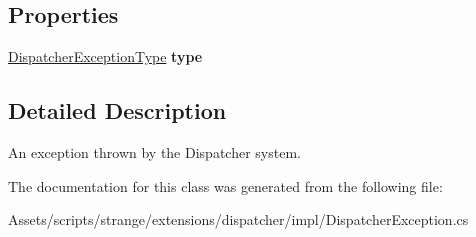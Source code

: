\subsection*{Properties}
\begin{DoxyCompactItemize}
\item 
\hypertarget{classstrange_1_1extensions_1_1dispatcher_1_1impl_1_1_dispatcher_exception_aaf683623803cc7c0b0cc725ed6349a3b}{\hyperlink{namespacestrange_1_1extensions_1_1dispatcher_1_1api_a03ba459ad62cc042c88405d9419eb4c6}{Dispatcher\-Exception\-Type} {\bfseries type}}\label{classstrange_1_1extensions_1_1dispatcher_1_1impl_1_1_dispatcher_exception_aaf683623803cc7c0b0cc725ed6349a3b}

\end{DoxyCompactItemize}


\subsection{Detailed Description}
An exception thrown by the Dispatcher system. 

The documentation for this class was generated from the following file\-:\begin{DoxyCompactItemize}
\item 
Assets/scripts/strange/extensions/dispatcher/impl/Dispatcher\-Exception.\-cs\end{DoxyCompactItemize}
